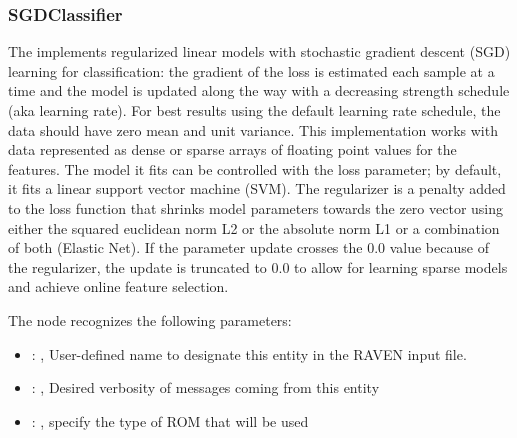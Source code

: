 \subsubsection{SGDClassifier}
  The  implements regularized linear models with stochastic
  gradient descent (SGD) learning for classification: the gradient of the loss is estimated each
  sample at                         a time and the model is updated along the way with a decreasing
  strength schedule                         (aka learning rate). For best results using the default
  learning rate schedule, the                         data should have zero mean and unit variance.
  This implementation works with data represented as dense or sparse arrays of floating
  point values for the features. The model it fits can be controlled with the loss parameter;
  by default, it fits a linear support vector machine (SVM).                         The regularizer
  is a penalty added to the loss function that shrinks model parameters towards
  the zero vector using either the squared euclidean norm L2 or the absolute norm L1 or a
  combination of both (Elastic Net). If the parameter update crosses the 0.0 value because
  of the regularizer, the update is truncated to $0.0$ to allow for learning sparse models and
  achieve online feature selection.                         

  The  node recognizes the following parameters:
    \begin{itemize}
      \item {}: ,
        User-defined name to designate this entity in the RAVEN input file.
      \item {}: ,
        Desired verbosity of messages coming from this entity
      \item {}: ,
        specify the type of ROM that will be used
  \end{itemize}

